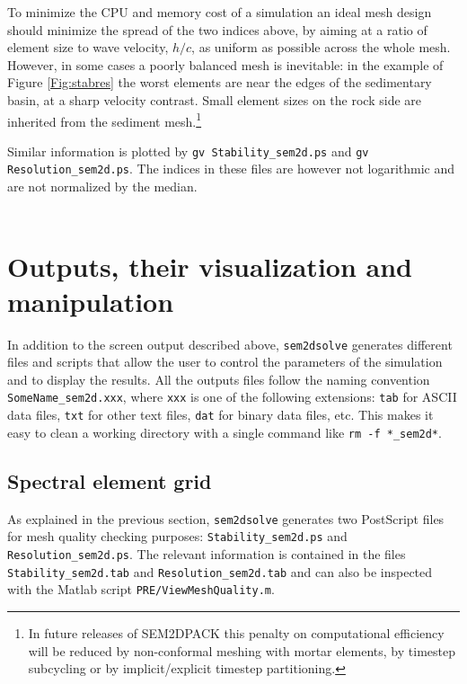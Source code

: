To minimize the CPU and memory cost of a simulation
an ideal mesh design should minimize the spread of the two indices above,
by aiming at a ratio of element size to wave velocity, $h/c$, 
as uniform as possible across the whole mesh.
However, in some cases a poorly balanced mesh is inevitable: in the example 
of Figure \ref{Fig:stabres} the worst elements are near the edges of the
sedimentary basin, at a sharp velocity contrast.
Small element sizes on the rock side are inherited from the sediment mesh.\footnote{In 
future releases of SEM2DPACK
this penalty on computational efficiency will be reduced by 
non-conformal meshing with mortar elements,
by timestep subcycling or by implicit/explicit timestep partitioning.}

Similar information is plotted by
\texttt{gv Stability\_sem2d.ps} and \texttt{gv Resolution\_sem2d.ps}.
The indices in these files are however not logarithmic and are
not normalized by the median.\\\


 
\section{Outputs, their visualization and manipulation}
\label{Sec:output}

In addition to the screen output described above,
\texttt{sem2dsolve} generates different
files and scripts that allow the user
to control the parameters of the simulation and to display the results.
All the outputs files follow the naming convention \texttt{SomeName\_sem2d.xxx},
where \texttt{xxx} is one of the following extensions:
\texttt{tab} for ASCII data files, \texttt{txt} for other text files,
\texttt{dat} for binary data files, etc.
This makes it easy to clean a working directory with a single command like
\texttt{rm -f *\_sem2d*}.

\subsection{Spectral element grid}

As explained in the previous section, 
\texttt{sem2dsolve} generates two PostScript files for 
mesh quality checking purposes:
\texttt{Stability\_sem2d.ps} and \texttt{Resolution\_sem2d.ps}.
The relevant information is contained
in the files \texttt{Stability\_sem2d.tab} and \texttt{Resolution\_sem2d.tab}
and can also be inspected with the Matlab script \texttt{PRE/ViewMeshQuality.m}.

